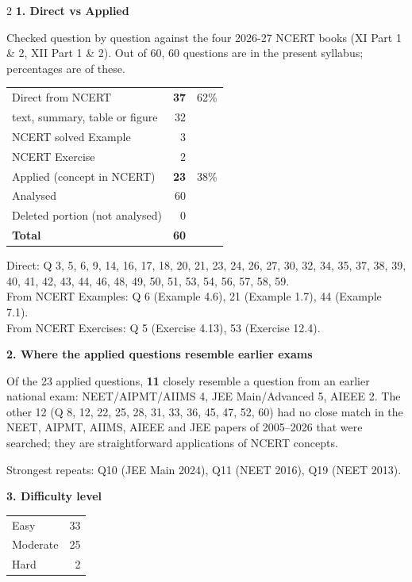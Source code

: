 \begin{multicols}{2}
\textbf{\color{crimson}1. Direct vs Applied}\par\smallskip
{\footnotesize Checked question by question against the four 2026-27 NCERT books (XI Part 1 \& 2, XII Part 1 \& 2). Out of 60, 60 questions are in the present syllabus; percentages are of these.}\par\smallskip
\begin{tabular}{@{}lrr@{}}\toprule
Direct from NCERT & \textbf{37} & 62\%\\
\quad text, summary, table or figure & 32 &\\
\quad NCERT solved Example & 3 &\\
\quad NCERT Exercise & 2 &\\
Applied (concept in NCERT) & \textbf{23} & 38\%\\\midrule
Analysed & 60 &\\
Deleted portion (not analysed) & 0 &\\\midrule
\textbf{Total} & \textbf{60} &\\\bottomrule\end{tabular}\par\smallskip
{\footnotesize Direct: Q 3, 5, 6, 9, 14, 16, 17, 18, 20, 21, 23, 24, 26, 27, 30, 32, 34, 35, 37, 38, 39, 40, 41, 42, 43, 44, 46, 48, 49, 50, 51, 53, 54, 56, 57, 58, 59.\\ From NCERT Examples: Q 6 (Example 4.6), 21 (Example 1.7), 44 (Example 7.1).\\ From NCERT Exercises: Q 5 (Exercise 4.13), 53 (Exercise 12.4).}\par\medskip
\textbf{\color{crimson}2. Where the applied questions resemble earlier exams}\par\smallskip
Of the 23 applied questions, \textbf{11} closely resemble a question from an earlier national exam:
NEET/AIPMT/AIIMS 4, JEE Main/Advanced 5, AIEEE 2. The other 12 (Q 8, 12, 22, 25, 28, 31, 33, 36, 45, 47, 52, 60) had no close match in the NEET, AIPMT, AIIMS, AIEEE and JEE papers of 2005--2026 that were searched; they are straightforward applications of NCERT concepts.\par
{\footnotesize Strongest repeats: Q10 (JEE Main 2024), Q11 (NEET 2016), Q19 (NEET 2013).}\par\medskip
\textbf{\color{crimson}3. Difficulty level}\par\smallskip
\begin{tabular}{@{}lr@{}}\toprule
Easy & 33\\ Moderate & 25\\ Hard & 2\\\bottomrule\end{tabular}\par\smallskip

\end{multicols}
